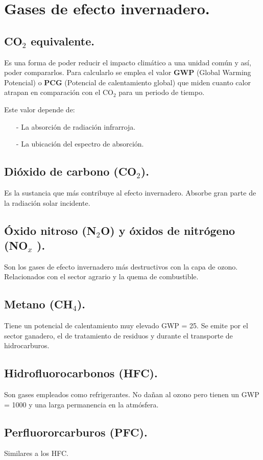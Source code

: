 \section{Gases de efecto invernadero.}
\subsection{CO$_2$ equivalente.}
Es una forma de poder reducir el impacto climático a una unidad común y así, poder compararlos. Para calcularlo se emplea el valor \textbf{GWP} (Global Warming Potencial) o \textbf{PCG} (Potencial de calentamiento global) que miden cuanto calor atrapan en comparación con el CO$_2$ para un periodo de tiempo. 


Este valor depende de:
\begin{itemize}
	\item [-] La absorción de radiación infrarroja.
	\item [-] La ubicación del espectro de absorción.
\end{itemize}
\subsection{Dióxido de carbono (CO$_2$).}
Es la sustancia que más contribuye al efecto invernadero. Absorbe gran parte de la radiación solar incidente.
\subsection{Óxido nitroso (N$_2$O) y óxidos de nitrógeno (NO$_x$ ).}
Son los gases de efecto invernadero más destructivos con la capa de ozono. Relacionados con el sector agrario y la quema de combustible.
\subsection{Metano (CH$_4$).}
Tiene un potencial de calentamiento muy elevado GWP = 25. Se emite por el sector ganadero, el de tratamiento de residuos y durante el transporte de hidrocarburos.
\subsection{Hidrofluorocarbonos (HFC).}
Son gases empleados como refrigerantes. No dañan al ozono pero tienen un GWP = 1000 y una larga permanencia en la atmósfera.
\subsection{Perfluororcarburos (PFC).}
Similares a los HFC.
